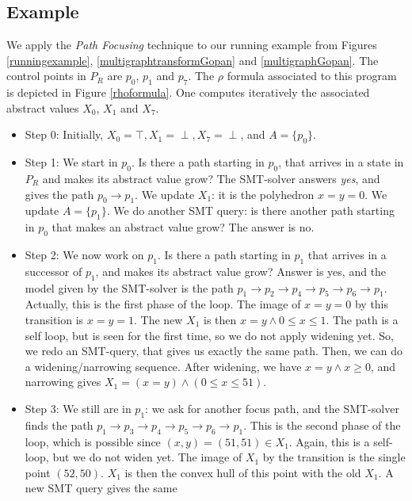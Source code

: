 \documentclass[a4paper,english,titlepage,11pt]{report}
\begin{document}
	\subsection{Example}

	We apply the \emph{Path Focusing} technique to our running example from
	Figures \ref{runningexample}, \ref{multigraphtransformGopan} and
	\ref{multigraphGopan}.
	The control points in $P_R$ are $p_0$, $p_1$ and $p_7$. 
	The $\rho$ formula associated to this program is depicted in
	Figure \ref{rhoformula}.
	One computes
	iteratively the associated abstract values $X_0$, $X_1$ and $X_7$.

\begin{itemize}
\item Step 0: Initially, $X_0 = \top, X_1 = \perp, X_7 = \perp$, and $A =
\{p_0\}$.
\item Step 1: We start in $p_0$. Is there a path starting in $p_0$, that arrives
in a state in $P_R$ and makes its abstract value grow? The SMT-solver answers
\emph{yes}, and gives the path $p_0 \rightarrow p_1$. We update $X_1$:
it is the polyhedron $x=y=0$. We update $A = \{p_1\}$. 
We do another SMT query: is there another path
starting in $p_0$ that makes an abstract value grow? The answer is no.
\item Step 2: We now work on $p_1$. Is there a path starting in $p_1$ that
arrives in a successor of $p_1$, and makes its abstract value grow? Answer is
yes, and the model given by the SMT-solver is the path $p_1 \rightarrow p_2
\rightarrow p_4 \rightarrow p_5 \rightarrow p_6 \rightarrow p_1$. Actually, this
is the first phase of the loop. 
The image of $x=y=0$ by this transition is $x=y=1$. The new $X_1$ is then $x=y
\wedge 0\leq x \leq 1$. The path is a self loop, but is seen for the first time,
so we do not apply widening yet. So, we redo an SMT-query, that gives us exactly
the same path. Then, we can do a widening/narrowing sequence. 
After widening, we have $x=y \wedge x \geq 0$, and narrowing gives $X_1 = (x=y)
\wedge (0 \leq x \leq 51)$.
\item Step 3: We still are in $p_1$: we ask for another focus path, and the
SMT-solver finds the path $p_1 \rightarrow p_3
\rightarrow p_4 \rightarrow p_5 \rightarrow p_6 \rightarrow p_1$. This is the
second phase of the loop, which is possible since $(x,y)=(51,51) \in X_1$.
Again, this is a self-loop, but we do not widen yet. The
image of $X_1$ by the transition is the single point $(52,50)$. $X_1$ is then
the convex hull of this point with the old $X_1$. A new SMT query gives the same

\end{itemize}
\end{document}
